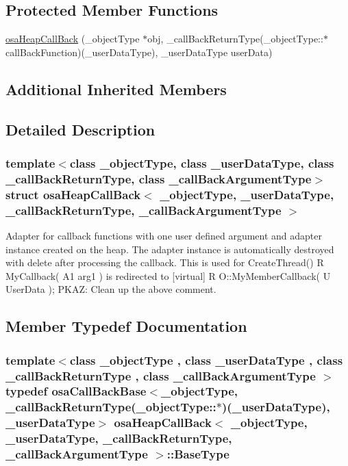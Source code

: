 \subsection*{Protected Member Functions}
\begin{DoxyCompactItemize}
\item 
\hyperlink{structosa_heap_call_back_a2e29b0f78f1c0c8248d18dfdbfa02418}{osa\-Heap\-Call\-Back} (\-\_\-object\-Type $\ast$obj, \-\_\-call\-Back\-Return\-Type(\-\_\-object\-Type\-::$\ast$call\-Back\-Function)(\-\_\-user\-Data\-Type), \-\_\-user\-Data\-Type user\-Data)
\end{DoxyCompactItemize}
\subsection*{Additional Inherited Members}


\subsection{Detailed Description}
\subsubsection*{template$<$class \-\_\-object\-Type, class \-\_\-user\-Data\-Type, class \-\_\-call\-Back\-Return\-Type, class \-\_\-call\-Back\-Argument\-Type$>$struct osa\-Heap\-Call\-Back$<$ \-\_\-object\-Type, \-\_\-user\-Data\-Type, \-\_\-call\-Back\-Return\-Type, \-\_\-call\-Back\-Argument\-Type $>$}

Adapter for callback functions with one user defined argument and adapter instance created on the heap. The adapter instance is automatically destroyed with delete after processing the callback. This is used for Create\-Thread() R My\-Callback( A1 arg1 ) is redirected to \mbox{[}virtual\mbox{]} R O\-::\-My\-Member\-Callback( U User\-Data ); P\-K\-A\-Z\-: Clean up the above comment. 

\subsection{Member Typedef Documentation}
\hypertarget{structosa_heap_call_back_a5ae1d7cd50191ab6f2026bf10b0fc3b5}{
\subsubsection[{Base\-Type}]{\setlength{\rightskip}{0pt plus 5cm}template$<$class \-\_\-object\-Type , class \-\_\-user\-Data\-Type , class \-\_\-call\-Back\-Return\-Type , class \-\_\-call\-Back\-Argument\-Type $>$ typedef {\bf osa\-Call\-Back\-Base}$<$\-\_\-object\-Type, \-\_\-call\-Back\-Return\-Type(\-\_\-object\-Type\-::$\ast$)(\-\_\-user\-Data\-Type), \-\_\-user\-Data\-Type$>$ {\bf osa\-Heap\-Call\-Back}$<$ \-\_\-object\-Type, \-\_\-user\-Data\-Type, \-\_\-call\-Back\-Return\-Type, \-\_\-call\-Back\-Argument\-Type $>$\-::{\bf Base\-Type}}}\label{structosa_heap_call_back_a5ae1d7cd50191ab6f2026bf10b0fc3b5}


